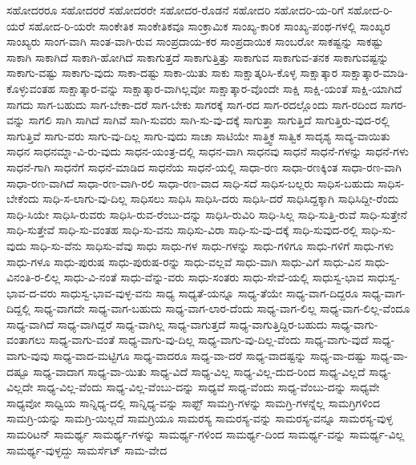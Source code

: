 {ಸಹೋದರರೂ
ಸಹೋದರರೆ
ಸಹೋದರರೇ
ಸಹೋದರ-ರೊಡನೆ
ಸಹೋದರಿ
ಸಹೋದರಿ-ಯ-ರಿಗೆ
ಸಹೋದ-ರಿ-ಯರೆ
ಸಹೋದ-ರಿ-ಯರೇ
ಸಾಂಕೇತಿಕ
ಸಾಂಕೇತಿಕವೂ
ಸಾಂಕ್ರಾಮಿಕ
ಸಾಂಖ್ಯ-ಕಾರಿಕ
ಸಾಂಖ್ಯ-ಪಂಥ-ಗಳಲ್ಲಿ
ಸಾಂಖ್ಯರ
ಸಾಂಖ್ಯರು
ಸಾಂಗ-ವಾಗಿ
ಸಾಂತ-ವಾಗಿ-ರುವ
ಸಾಂಪ್ರದಾಯ-ಕರ
ಸಾಂಪ್ರದಾಯಿಕ
ಸಾಂಬರೋ
ಸಾಕಷ್ಟನ್ನು
ಸಾಕಷ್ಟು
ಸಾಕಾಗಿ
ಸಾಕಾಗಿದೆ
ಸಾಕಾಗಿ-ಹೋಗಿದೆ
ಸಾಕಾಗುತ್ತದೆ
ಸಾಕಾಗುತ್ತಿತ್ತು
ಸಾಕಾಗುವ
ಸಾಕಾಗುವ-ತನಕ
ಸಾಕಾಗುವಷ್ಟನ್ನು
ಸಾಕಾಗು-ವಷ್ಟು
ಸಾಕಾಗು-ವುದು
ಸಾಕಾ-ದಷ್ಟು
ಸಾಕಾ-ಯಿತು
ಸಾಕು
ಸಾಕ್ಷಾತ್ಕರಿಸಿ-ಕೊಳ್ಳ
ಸಾಕ್ಷಾತ್ಕಾರ
ಸಾಕ್ಷಾತ್ಕಾರ-ಮಾಡಿ-ಕೊಳ್ಳುವಂತಹ
ಸಾಕ್ಷಾತ್ಕಾರ-ವನ್ನು
ಸಾಕ್ಷಾತ್ಕಾರ-ವಾಗಿಲ್ಲವೋ
ಸಾಕ್ಷಾತ್ಕಾರ-ವೊಂದೇ
ಸಾಕ್ಷಿ
ಸಾಕ್ಷಿ-ಯಂತೆ
ಸಾಕ್ಷಿ-ಯಾಗಿದೆ
ಸಾಗದು
ಸಾಗ-ಬಹುದು
ಸಾಗ-ಬೇಕಾ-ದರೆ
ಸಾಗ-ಬೇಕು
ಸಾಗರಕ್ಕೆ
ಸಾಗ-ರದ
ಸಾಗ-ರದಲ್ಲೊಂದು
ಸಾಗ-ರದಿಂದ
ಸಾಗರ-ವನ್ನು
ಸಾಗಲಿ
ಸಾಗಿ
ಸಾಗಿದೆ
ಸಾಗಿವೆ
ಸಾಗಿ-ಸುವರು
ಸಾಗಿ-ಸು-ವು-ದಕ್ಕೆ
ಸಾಗುತ್ತಾ
ಸಾಗುತ್ತಿದೆ
ಸಾಗುತ್ತಿರು-ವುದ-ರಲ್ಲಿ
ಸಾಗುತ್ತಿವೆ
ಸಾಗು-ವರು
ಸಾಗು-ವು-ದಿಲ್ಲ
ಸಾಗು-ವುದು
ಸಾಚಾ
ಸಾಟಿಯೇ
ಸಾತ್ತ್ವಿಕ
ಸಾತ್ವಿಕ
ಸಾದೃಶ್ಯ
ಸಾದ್ಯ-ವಾಯಿತು
ಸಾಧನ
ಸಾಧನಮ್ನಾ-ವಿ-ರು-ವುದು
ಸಾಧನ-ಯಂತ್ರ-ದಲ್ಲಿ
ಸಾಧನ-ವಾಗಿ
ಸಾಧನವು
ಸಾಧನೆ
ಸಾಧನೆ-ಗಳನ್ನು
ಸಾಧನೆ-ಗಳು
ಸಾಧನೆ-ಗಾಗಿ
ಸಾಧನೆಗೆ
ಸಾಧನೆ-ಮಾಡಿದ
ಸಾಧನೆಯ
ಸಾಧನೆ-ಯಲ್ಲಿ
ಸಾಧಾ-ರಣ
ಸಾಧಾ-ರಣಕ್ಕಿಂತ
ಸಾಧಾ-ರಣ-ವಾಗಿ
ಸಾಧಾ-ರಣ-ವಾಗಿದೆ
ಸಾಧಾ-ರಣ-ವಾಗಿ-ರಲಿ
ಸಾಧಾ-ರಣ-ವಾದ
ಸಾಧಿ-ಸದೆ
ಸಾಧಿಸ-ಬಲ್ಲರು
ಸಾಧಿಸ-ಬಹುದು
ಸಾಧಿಸ-ಬೇಕೆಂದು
ಸಾಧಿ-ಸ-ಲಾಗು-ವು-ದಿಲ್ಲ
ಸಾಧಿಸಲು
ಸಾಧಿಸಿ
ಸಾಧಿಸಿ-ದರು
ಸಾಧಿಸಿ-ದರೆ
ಸಾಧಿಸಿದ್ದಕ್ಕಾಗಿ
ಸಾಧಿಸಿದ್ದೀ-ರೆಂದು
ಸಾಧಿ-ಸಿಯೇ
ಸಾಧಿಸಿ-ರುವರು
ಸಾಧಿಸಿ-ರುವ-ರೆಂಬು-ದನ್ನು
ಸಾಧಿಸಿ-ರುವಿರಿ
ಸಾಧಿ-ಸಿಲ್ಲ
ಸಾಧಿ-ಸುತ್ತಿ-ರುವೆ
ಸಾಧಿ-ಸುತ್ತೇನೆ
ಸಾಧಿ-ಸುತ್ತೇವೆ
ಸಾಧಿ-ಸು-ವಂತಹ
ಸಾಧಿ-ಸು-ವನು
ಸಾಧಿಸು-ವಿರಾ
ಸಾಧಿ-ಸು-ವು-ದಕ್ಕೆ
ಸಾಧಿ-ಸುವುದ-ರಲ್ಲಿ
ಸಾಧಿ-ಸು-ವುದು
ಸಾಧಿ-ಸು-ವೆನು
ಸಾಧಿಸು-ವೆವು
ಸಾಧು
ಸಾಧು-ಗಳ
ಸಾಧು-ಗಳನ್ನು
ಸಾಧು-ಗಳಿಗೂ
ಸಾಧು-ಗಳಿಗೆ
ಸಾಧು-ಗಳು
ಸಾಧು-ಗಳೂ
ಸಾಧು-ಪುರುಷ
ಸಾಧು-ಪುರುಷ-ರನ್ನು
ಸಾಧು-ವಲ್ಲವೆ
ಸಾಧು-ವಾಗಿ
ಸಾಧು-ವಿಗೆ
ಸಾಧು-ವಿನ
ಸಾಧು-ವಿನಂತಿ-ರ-ಲಿಲ್ಲ
ಸಾಧು-ವಿ-ನಂತೆ
ಸಾಧು-ವೆನ್ನು-ವರು
ಸಾಧು-ಸಂತರು
ಸಾಧು-ಸೇವೆ-ಯಲ್ಲಿ
ಸಾಧುಸ್ವ-ಭಾವ
ಸಾಧುಸ್ವ-ಭಾವ-ದ-ವರು
ಸಾಧುಸ್ವ-ಭಾವ-ವುಳ್ಳ-ವನು
ಸಾಧ್ಯ
ಸಾಧ್ಯತೆ-ಯನ್ನೂ
ಸಾಧ್ಯ-ತೆಯೇ
ಸಾಧ್ಯ-ವಾಗ-ದಿದ್ದರೂ
ಸಾಧ್ಯ-ವಾಗ-ದಿದ್ದಲ್ಲಿ
ಸಾಧ್ಯ-ವಾಗದೇ
ಸಾಧ್ಯ-ವಾಗ-ಬಹುದು
ಸಾಧ್ಯ-ವಾಗ-ಲಾರ-ದೆಂದು
ಸಾಧ್ಯ-ವಾಗ-ಲಿಲ್ಲ
ಸಾಧ್ಯ-ವಾಗ-ಲಿಲ್ಲ-ವೆಂದೂ
ಸಾಧ್ಯ-ವಾಗಿದೆ
ಸಾಧ್ಯ-ವಾಗಿದ್ದರೆ
ಸಾಧ್ಯ-ವಾಗಿಲ್ಲ
ಸಾಧ್ಯ-ವಾಗುತ್ತದೆ
ಸಾಧ್ಯ-ವಾಗುತ್ತಿದ್ದಿರ-ಬಹುದು
ಸಾಧ್ಯ-ವಾಗು-ವಂತಾಗಲು
ಸಾಧ್ಯ-ವಾಗು-ವಂತೆ
ಸಾಧ್ಯ-ವಾಗು-ವು-ದಿಲ್ಲ
ಸಾಧ್ಯ-ವಾಗು-ವು-ದಿಲ್ಲ-ವೆಂದು
ಸಾಧ್ಯ-ವಾಗು-ವುದೆ
ಸಾಧ್ಯ-ವಾಗು-ವುವು
ಸಾಧ್ಯ-ವಾದ-ಮಟ್ಟಿಗೂ
ಸಾಧ್ಯ-ವಾದರೂ
ಸಾಧ್ಯ-ವಾ-ದರೆ
ಸಾಧ್ಯ-ವಾದಷ್ಟನ್ನು
ಸಾಧ್ಯ-ವಾ-ದಷ್ಟು
ಸಾಧ್ಯ-ವಾ-ದಷ್ಟೂ
ಸಾಧ್ಯ-ವಾದಾಗ
ಸಾಧ್ಯ-ವಾ-ಯಿತು
ಸಾಧ್ಯ-ವಿದೆ
ಸಾಧ್ಯ-ವಿಲ್ಲ
ಸಾಧ್ಯ-ವಿಲ್ಲ-ದುದ-ರಿಂದ
ಸಾಧ್ಯ-ವಿಲ್ಲದೆ
ಸಾಧ್ಯ-ವಿಲ್ಲದೇ
ಸಾಧ್ಯ-ವಿಲ್ಲ-ವೆಂದು
ಸಾಧ್ಯ-ವಿಲ್ಲ-ವೆಂಬು-ದನ್ನು
ಸಾಧ್ಯವೆ
ಸಾಧ್ಯ-ವೆಂದು
ಸಾಧ್ಯ-ವೆಂಬು-ದನ್ನು
ಸಾಧ್ಯವೇ
ಸಾಧ್ಯವೋ
ಸಾಧ್ವಿಯ
ಸಾನ್ನಿಧ್ಯ-ದಲ್ಲಿ
ಸಾನ್ನಿಧ್ಯ-ವನ್ನು
ಸಾಫ್ಟ್
ಸಾಮಗ್ರಿ-ಗಳನ್ನು
ಸಾಮಗ್ರಿ-ಗಳನ್ನೆಲ್ಲ
ಸಾಮಗ್ರಿಗಳಿಂದ
ಸಾಮಗ್ರಿ-ಯನ್ನು
ಸಾಮಗ್ರಿ-ಯಿಲ್ಲದೆ
ಸಾಮಗ್ರಿಯೂ
ಸಾಮರಸ್ಯ
ಸಾಮರಸ್ಯ-ವನ್ನು
ಸಾಮರಸ್ಯ-ವನ್ನೂ
ಸಾಮರಸ್ಯ-ವುಳ್ಳ
ಸಾಮರಿಟನ್
ಸಾಮರ್ಥ್ಯ
ಸಾಮರ್ಥ್ಯ-ಗಳನ್ನು
ಸಾಮರ್ಥ್ಯ-ಗಳಿಂದ
ಸಾಮರ್ಥ್ಯ-ದಿಂದ
ಸಾಮರ್ಥ್ಯ-ವನ್ನು
ಸಾಮರ್ಥ್ಯ-ವಿಲ್ಲ
ಸಾಮರ್ಥ್ಯ-ವುಳ್ಳದ್ದು
ಸಾಮರ್ಸೆಟ್
ಸಾಮ-ವೇದ
}
